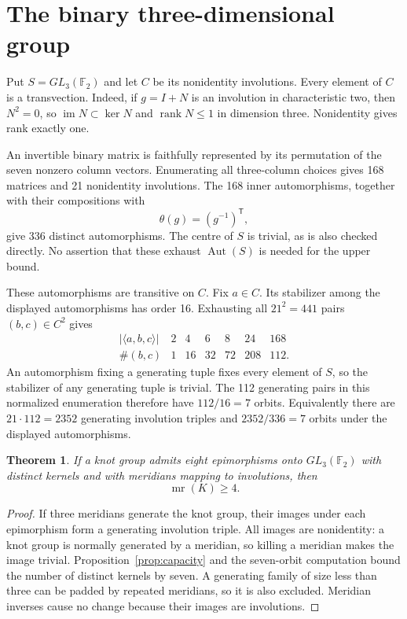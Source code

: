 \documentclass[11pt]{article}
\newtheorem{theorem}{Theorem}
\newcommand{\mr}{\operatorname{mr}}
\newcommand{\Aut}{\operatorname{Aut}}
\newcommand{\F}{\mathbb F}
\begin{document}
\section{The binary three-dimensional group}

Put $S=GL_3(\F_2)$ and let $C$ be its nonidentity involutions.
Every element of $C$ is a transvection.  Indeed, if $g=I+N$ is an
involution in characteristic two, then $N^2=0$, so
$\operatorname{im}N\subset\ker N$ and $\operatorname{rank}N\le1$
in dimension three.  Nonidentity gives rank exactly one.

An invertible binary matrix is faithfully represented by its
permutation of the seven nonzero column vectors.  Enumerating all
three-column choices gives 168 matrices and 21 nonidentity involutions.
The 168 inner automorphisms, together with their compositions with
\[
                        \theta(g)=(g^{-1})^{\mathsf T},
\]
give 336 distinct automorphisms.  The centre of $S$ is trivial, as is
also checked directly.  No assertion that these exhaust $\Aut(S)$ is
needed for the upper bound.

These automorphisms are transitive on $C$.  Fix $a\in C$.
Its stabilizer among the displayed automorphisms has order 16.
Exhausting all $21^2=441$ pairs $(b,c)\in C^2$ gives
\[
\begin{array}{c|rrrrrr}
|\langle a,b,c\rangle|&2&4&6&8&24&168\\\hline
\#(b,c)&1&16&32&72&208&112.
\end{array}
\]
An automorphism fixing a generating tuple fixes every element of $S$,
so the stabilizer of any generating tuple is trivial.  The 112
generating pairs in this normalized enumeration therefore have
$112/16=7$ orbits.  Equivalently there are $21\cdot112=2352$
generating involution triples and $2352/336=7$ orbits under the
displayed automorphisms.

\begin{theorem}\label{thm:seven}
If a knot group admits eight epimorphisms onto $GL_3(\F_2)$ with
distinct kernels and with meridians mapping to involutions, then
\[
                              \mr(K)\ge4.
\]
\end{theorem}
\begin{proof}
If three meridians generate the knot group, their images under each
epimorphism form a generating involution triple.  All images are
nonidentity: a knot group is normally generated by a meridian, so
killing a meridian makes the image trivial.  Proposition~\ref{prop:capacity}
and the seven-orbit computation bound the number of distinct kernels
by seven.  A generating family of size less than three can be padded
by repeated meridians, so it is also excluded.  Meridian inverses cause
no change because their images are involutions.
\end{proof}
\end{document}
